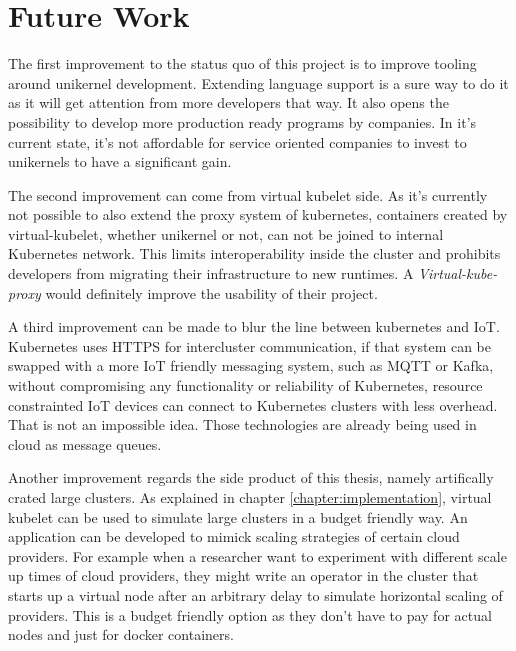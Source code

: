 \section{Future Work}
The first improvement to the status quo of this project is to improve tooling around unikernel development. Extending language support is a sure way to do it as it will get attention from more developers that way. It also opens the possibility to develop more production ready programs by companies. In it's current state, it's not affordable for service oriented companies to invest to unikernels to have a significant gain.

The second improvement can come from virtual kubelet side. As it's currently not possible to also extend the proxy system of kubernetes, containers created by virtual-kubelet, whether unikernel or not, can not be joined to internal Kubernetes network. This limits interoperability inside the cluster and prohibits developers from migrating their infrastructure to new runtimes. A \textit{Virtual-kube-proxy} would definitely improve the usability of their project.

A third improvement can be made to blur the line between kubernetes and IoT. Kubernetes uses HTTPS for intercluster communication, if that system can be swapped with a more IoT friendly messaging system, such as MQTT or Kafka, without compromising any functionality or reliability of Kubernetes, resource constrainted IoT devices can connect to Kubernetes clusters with less overhead. That is not an impossible idea. Those technologies are already being used in cloud as message queues.

Another improvement regards the side product of this thesis, namely artifically crated large clusters. As explained in chapter \ref{chapter:implementation}, virtual kubelet can be used to simulate large clusters in a budget friendly way. An application can be developed to mimick scaling strategies of certain cloud providers. For example when a researcher want to experiment with different scale up times of cloud providers, they might write an operator in the cluster that starts up a virtual node after an arbitrary delay to simulate horizontal scaling of providers. This is a budget friendly option as they don't have to pay for actual nodes and just for docker containers.
